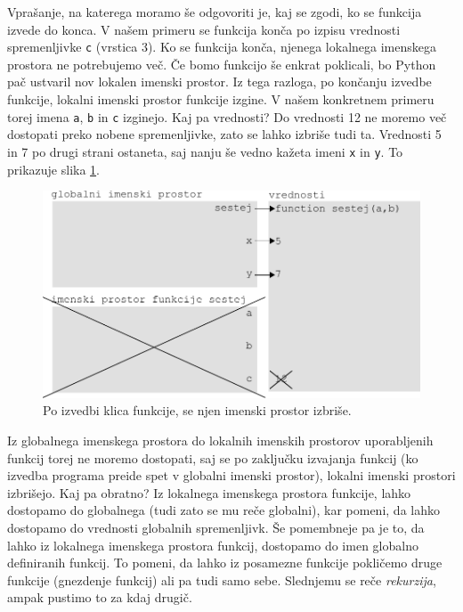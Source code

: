 Vprašanje, na katerega moramo še odgovoriti je, kaj se zgodi, ko se funkcija izvede do konca. V našem primeru se funkcija konča po izpisu vrednosti spremenljivke \texttt{c} (vrstica 3). Ko se funkcija konča, njenega lokalnega imenskega prostora ne potrebujemo več. Če bomo funkcijo še enkrat poklicali, bo Python pač ustvaril nov lokalen imenski prostor. Iz tega razloga, po končanju izvedbe funkcije, lokalni imenski prostor funkcije izgine. V našem konkretnem primeru torej imena \texttt{a}, \texttt{b} in \texttt{c} izginejo. Kaj pa vrednosti? Do vrednosti 12 ne moremo več dostopati preko nobene spremenljivke, zato se lahko izbriše tudi ta. Vrednosti 5 in 7 po drugi strani ostaneta, saj nanju še vedno kažeta imeni \texttt{x} in \texttt{y}. To prikazuje slika \ref{img:imenski_prostor_6}.
\begin{figure}
    \centering
    \includegraphics[width=\linewidth]{img/imenski_prostor_6.pdf}
    \caption{Po izvedbi klica funkcije, se njen imenski prostor izbriše.}
    \label{img:imenski_prostor_6}
\end{figure}

Iz globalnega imenskega prostora do lokalnih imenskih prostorov uporabljenih funkcij torej ne moremo dostopati, saj se po zaključku izvajanja funkcij (ko izvedba programa preide spet v globalni imenski prostor), lokalni imenski prostori izbrišejo. Kaj pa obratno? Iz lokalnega imenskega prostora funkcije, lahko dostopamo do globalnega (tudi zato se mu reče globalni), kar pomeni, da lahko dostopamo do vrednosti globalnih spremenljivk. Še pomembneje pa je to, da lahko iz lokalnega imenskega prostora funkcij, dostopamo do imen globalno definiranih funkcij. To pomeni, da lahko iz posamezne funkcije pokličemo druge funkcije (gnezdenje funkcij) ali pa tudi samo sebe. Slednjemu se reče \emph{rekurzija}, ampak pustimo to za kdaj drugič. 

